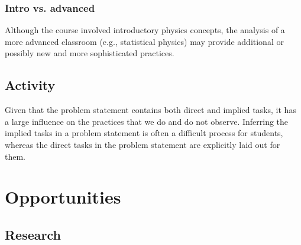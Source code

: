 \documentclass{msuphddissertation}
\begin{document}
\begin{doublespace}
\subsubsection{Intro vs. advanced}

Although the course involved introductory physics concepts, the analysis of a more advanced classroom (e.g., statistical physics) may provide additional or possibly new and more sophisticated practices.



\subsection{Activity}\label{CH6:Activity}

Given that the problem statement contains both direct and implied tasks, it has a large influence on the practices that we do and do not observe.  Inferring the implied tasks in a problem statement is often a difficult process for students, whereas the direct tasks in the problem statement are explicitly laid out for them.

\section{Opportunities}


\subsection{Research}




\end{doublespace}
\end{document}
